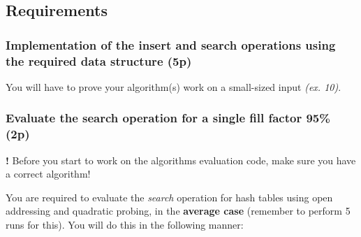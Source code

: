\documentclass[../en-fa-lab.tex]{subfiles}
\begin{document}
\subsection{Requirements}\label{requirements}

\subsubsection{Implementation of the insert and search operations using the
required data structure
(5p)}\label{implementation-of-the-insert-and-search-operations-using-the-required-data-structure-5p}

You will have to prove your algorithm(s) work on a small-sized input
\emph{(ex. 10)}.

\subsubsection{Evaluate the search operation for a single fill factor 95\%
(2p)}\label{evaluate-the-search-operation-for-a-single-fill-factor-95-2p}

\textbf{!} Before you start to work on the algorithms evaluation code,
make sure you have a correct algorithm!

You are required to evaluate the \emph{search} operation for hash tables
using open addressing and quadratic probing, in the \textbf{average
case} (remember to perform 5 runs for this). You will do this in the
following manner:
\end{document}
